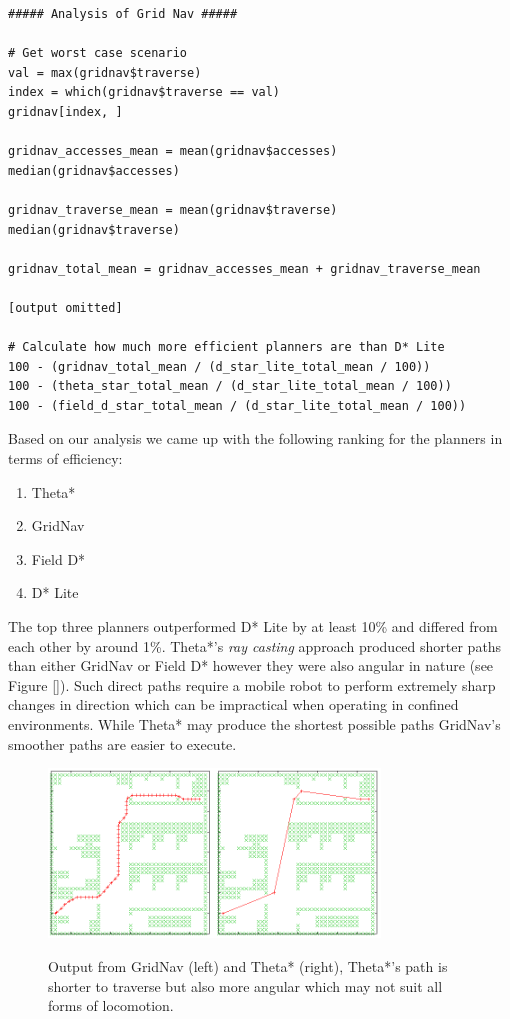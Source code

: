 \begin{lstlisting}
##### Analysis of Grid Nav #####

# Get worst case scenario
val = max(gridnav$traverse)
index = which(gridnav$traverse == val)
gridnav[index, ]

gridnav_accesses_mean = mean(gridnav$accesses)
median(gridnav$accesses)

gridnav_traverse_mean = mean(gridnav$traverse)
median(gridnav$traverse)

gridnav_total_mean = gridnav_accesses_mean + gridnav_traverse_mean

[output omitted]

# Calculate how much more efficient planners are than D* Lite
100 - (gridnav_total_mean / (d_star_lite_total_mean / 100))
100 - (theta_star_total_mean / (d_star_lite_total_mean / 100))
100 - (field_d_star_total_mean / (d_star_lite_total_mean / 100))
\end{lstlisting}

\noindent
Based on our analysis we came up with the following ranking for the planners in terms of efficiency:

\begin{enumerate}
\item Theta*
\item GridNav
\item Field D*
\item D* Lite
\end{enumerate}

\noindent
The top three planners outperformed D* Lite by at least 10\% and differed from each other by around 1\%. Theta*'s \textit{ray casting} approach produced shorter paths than either GridNav or Field D* however they were also angular in nature (see Figure \ref{}). Such direct paths require a mobile robot to perform extremely sharp changes in direction which can be impractical when operating in confined environments. While Theta* may produce the shortest possible paths GridNav's smoother paths are easier to execute.

\begin{figure}[htbp]

\center \includegraphics[width=250pt]{illustrations/comparison}\\
\caption{Output from GridNav (left) and Theta* (right), Theta*'s path is shorter to traverse but also more angular which may not suit all forms of locomotion.} 
\label{floor_plan}

\end{figure}

